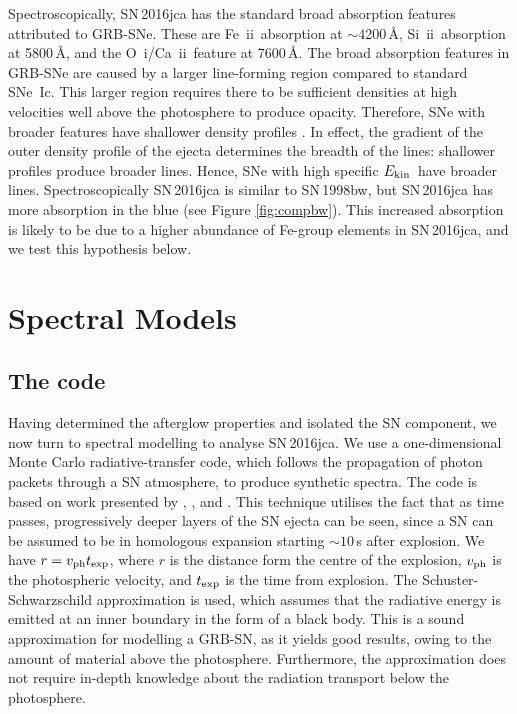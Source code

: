 \documentclass[fleqn,usenatbib]{mnras}
\newcommand{\OI}{O~{\sc i}}
\newcommand{\SiII}{Si~{\sc ii}}
\newcommand{\CaII}{Ca~{\sc ii}}
\newcommand{\FeII}{Fe~{\sc ii}}
\newcommand{\KE}{$E_{\rm kin}$}
\newcommand{\ab}{$\sim$}
\begin{document}
Spectroscopically, SN\,2016jca has the standard broad absorption features attributed to
GRB-SNe. These are \FeII\ absorption at \ab4200\,\AA, \SiII\ absorption at 5800\,\AA, 
and the \OI/\CaII\ feature at 7600\,\AA.
The broad absorption features in GRB-SNe are caused
by a larger line-forming region compared to standard SNe~Ic. 
This larger region requires there to be sufficient densities at high 
velocities well above the photosphere to produce opacity.  Therefore, SNe with 
broader features have shallower density profiles \citep{Mazzali17}.  In effect, 
the gradient of the outer density profile of the ejecta 
determines the breadth of the lines: shallower profiles produce broader lines.
Hence, SNe with high specific \KE\ have broader lines. 
Spectroscopically SN\,2016jca is similar to SN\,1998bw, but SN\,2016jca 
has more absorption in the blue (see Figure \ref{fig:compbw}). 
This increased absorption is likely to be due to a higher abundance of Fe-group 
elements in SN\,2016jca, and we test this hypothesis below. 


\section{Spectral Models}

\subsection{The code}

Having determined the afterglow properties and isolated the SN component, we now turn to spectral
modelling to analyse SN\,2016jca.  We use a one-dimensional Monte Carlo radiative-transfer code, 
which follows the propagation of photon packets through a SN atmosphere, to produce synthetic spectra. 
The code is based on work presented by \citet{Mazzali93}, \citep{Lucy99}, and \citep{Mazzali00}.
This technique utilises the fact that as time passes, progressively deeper layers of the 
SN ejecta can be seen, since a SN can be assumed to be in homologous expansion starting $\sim10$\,s after explosion. 
We have $r=v_{\rm ph} t_{\rm exp}$, where $r$ is the distance form the centre of the explosion,  $v_{\rm ph}$ is the photospheric 
velocity, and $t_{\rm exp}$ is the time from explosion. The Schuster-Schwarzschild approximation is used, which assumes that 
the radiative energy is emitted at an inner boundary in the form of a black body. This is a sound approximation
for modelling a GRB-SN, as it yields good results, owing to the amount of material above the photosphere.
Furthermore, the approximation does not require in-depth knowledge about the radiation  transport below the photosphere.
\end{document}
